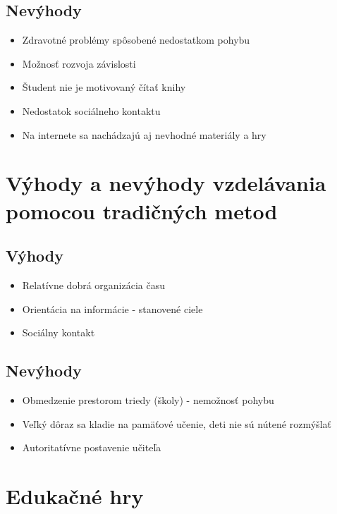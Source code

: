 \documentclass[10pt,twoside,slovak,a4paper]{article}
\begin{document}
\subsection{Nevýhody}\label{vyhodynevyhodyhier:nevyhody} 
\begin{itemize}
\item Zdravotné problémy spôsobené nedostatkom pohybu
\item Možnosť rozvoja závislosti
\item Študent nie je motivovaný čítať knihy
\item Nedostatok sociálneho kontaktu
\item Na internete sa nachádzajú aj nevhodné materiály a hry
\end{itemize}



\section{Výhody a nevýhody vzdelávania pomocou tradičných metod} \label{vyhodynevyhodytrad}

\subsection{Výhody}\label{vyhodynevyhodytrad:vyhody} 
\begin{itemize}
\item Relatívne dobrá organizácia času
\item Orientácia na informácie - stanovené ciele
\item Sociálny kontakt
\end{itemize}



\subsection{Nevýhody}\label{vyhodynevyhodytrad:nevyhody} 
\begin{itemize}
\item Obmedzenie prestorom triedy (školy) - nemožnosť pohybu
\item Veľký dôraz sa kladie na pamäťové učenie, deti nie sú nútené rozmýšlať
\item Autoritatívne postavenie učiteľa
\end{itemize}

\section{Edukačné hry\cite{strankahry}}\label{edukacnehry}
\end{document}

